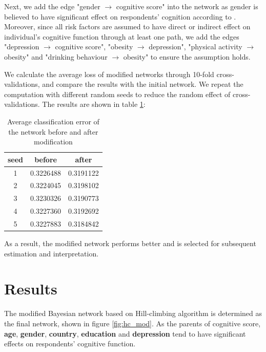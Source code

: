\documentclass[11pt,twoside]{article}
\numberwithin{Theorem}{section}
\numberwithin{Definition}{section}
\numberwithin{Lemma}{section}
\numberwithin{Algorithm}{section}
\numberwithin{equation}{section}
\begin{document}
Next, we add the edge "gender $\rightarrow$ cognitive score" into the network as gender is believed to have significant effect on respondents' cognition according to \cite{beam2018differences}. Moreover, since all risk factors are assumed to have direct or indirect effect on individual's cognitive function through at least one path, we add the edges "depression $\rightarrow$ cognitive score", "obesity $\rightarrow$ depression", "physical activity $\rightarrow$ obesity" and "drinking behaviour $\rightarrow$ obesity" to ensure the assumption holds. 

We calculate the average loss of modified networks through 10-fold cross-validations, and compare the results with the initial network. We repeat the computation with different random seeds to reduce the random effect of cross-validations. The results are shown in table \ref{tab:hc}:

\begin{table}[!h]
	\centering
	\begin{tabular}{|c|c|c|}
		\hline
		seed & before & after \\
		\hline
		1 & 0.3226488 & 0.3191122 \\
		2 & 0.3224045 & 0.3198102 \\
		3 & 0.3230326 & 0.3190773 \\
		4 & 0.3227360 & 0.3192692 \\
		5 & 0.3227883 & 0.3184842 \\
		\hline
	\end{tabular}
	\caption{Average classification error of the network before and after modification}
	\label{tab:hc}
\end{table}

As a result, the modified network performs better and is selected for subsequent estimation and interpretation.

\clearpage

\section{Results}
\label{sec:results}

The modified Bayesian network based on Hill-climbing algorithm is determined as the final network, shown in figure \ref{fig:hc_mod}.  As the parents of cognitive score, \textbf{age}, \textbf{gender}, \textbf{country}, \textbf{education} and \textbf{depression} tend to have significant effects on respondents' cognitive function. 
\end{document}
